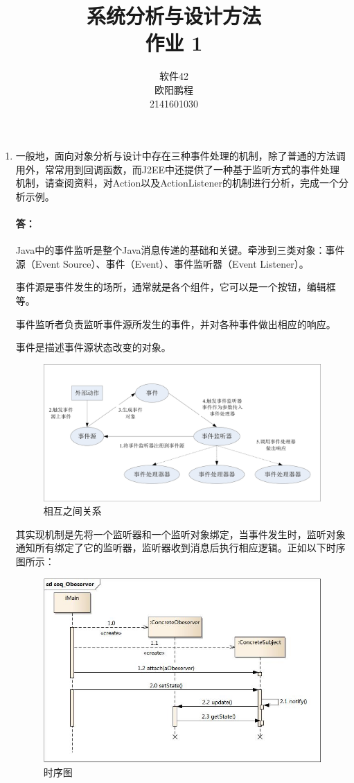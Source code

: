 \documentclass[UTF8]{ctexart}
\title{系统分析与设计方法 \\ 作业 1}
\author{软件42 \\ 欧阳鹏程 \\ 2141601030}
\begin{document}
\maketitle

\begin{enumerate}
	\item{一般地，面向对象分析与设计中存在三种事件处理的机制，除了普通的方法调用外，常常用到回调函数，而J2EE中还提供了一种基于监听方式的事件处理机制，请查阅资料，对Action以及ActionListener的机制进行分析，完成一个分析示例。}
	
	\paragraph{答：}
	Java中的事件监听是整个Java消息传递的基础和关键。牵涉到三类对象：事件源（Event Source）、事件（Event）、事件监听器（Event Listener）。 
	
	事件源是事件发生的场所，通常就是各个组件，它可以是一个按钮，编辑框等。 
	
	事件监听者负责监听事件源所发生的事件，并对各种事件做出相应的响应。 
	
	事件是描述事件源状态改变的对象。 
	
	\begin{figure}[H]
		\centering
		\includegraphics[width=\textwidth]{1.jpg}
		\caption{相互之间关系}
	\end{figure}

	其实现机制是先将一个监听器和一个监听对象绑定，当事件发生时，监听对象通知所有绑定了它的监听器，监听器收到消息后执行相应逻辑。正如以下时序图所示：
	
	\begin{figure}[H]
		\centering
		\includegraphics[width=\textwidth]{2.jpg}
		\caption{时序图}
	\end{figure}
\end{enumerate}
\end{document}
